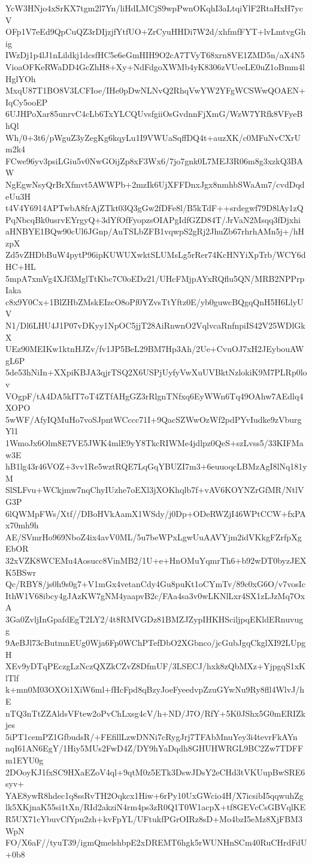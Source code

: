 YcW3HNjo4xSrKX7tgm2l7Yn/liHdLMCjS9wpPwnOKqhI3aLtqiYlF2RtaHxH7ycV
OFp1V7eEd9QpCuQZ3rDIjzjfYtfUO+ZrCyuHHDi7W2d/xhfmfFYT+lvLmtvgGhig
IWzDj1p4lJ1nLildkj1dcsfHC5e6eGmHIH9O2cA7TVyT68xrn8VE1ZMD5n/aX4N5
VioaOFKeRWaDD4GcZhH8+Xy+NdFdgoXWMb4yK8306zVUeeLE0uZ1oBmm4lHglYOh
MxqU87T1BO8V3LCFIoe/IHe0pDwNLNvQ2RhqVwYW2YFgWCSWwQOAEN+IqCy5ooEP
6UJHPoXar85unrvC4cLb6TxYLCQUvsfgiiOsGvdnnFjXmG/WzW7YRfk8VFyeBhQl
Wh/0+3t6/pWguZ3yZegKg6kqyLu1I9VWUaSqffDQ4t+auzXK/c0MFuNvCXrUm2k4
FCwe96yv3psiLGiu5v0NwGOijZp8xF3Wx6/7jo7gnk0L7MEJ3R06m8g3xzkQ3BAW
NgEgwNsyQrBrXfmvt5AWWPb+2mzIk6UjXFFDnxJgx8nmhbSWaAm7/cvdDqdeUu3H
t4V4Y6914APTwbA8frAjZTkt03Q3gGw2fDFe8l/B5kTdF++srdegwf79D8lAy1zQ
PqNbcqBk0usrvEYrgyQ+3dYfOfFyopzsOIAPgIdfGZD84T/JrVaN2Msqq3fDjxhi
aHNBYE1BQw90cUl6JGnp/AuTSLbZFB1vqwpS2gRj2JhuZb67rhrhAMn5j+/hHzpX
Zd5vZHDbBuW4pytP96ipKUWUXwktSLUMsLg5rRer74KcHNYiXpTrb/WCY6dHC+HL
5mpA7xmVg4XJf3MglTtKbc7C0oEDz21/UHcFMjpAYxRQflu5QN/MRB2NPPrpIaka
c8x9Y0Cx+1BlZHbZMskEIzcO8oPf0YZvsTtYftz0E/yb0guwcBQgqQnH5H6LlyUV
N1/Dl6LHU4J1P07vDKyy1NpOC5jjT28AiRnwnO2VqlvcaRnfnpiIS42V25WDlGkX
UEz90MEIKw1ktnHJZv/fv1JP5BeL29BM7Hp3Ah/2Ue+CvuOJ7xH2JEybouAWgL6P
5de53hNiIn+XXpiKBJA3qjrTSQ2X6USPjUyfyVwXuUVBktNzlokiK9M7PLRp0lov
VOgpF/tA4DA5kIT7oT4ZTfAHgGZ3rRlgnTNfxq6EyWWn6Tq49OAhw7AEdlq4XOPO
5wWF/AfyIQMuHo7voSJpntWCccc71I+9QacSZWwOzWf2pdPYvIudke9zVburgYl1
1WmoJx6Olm8E7VE5JWK4mlE9yY8TkcRIWMe4jdlpz0QeS+szLvss5/33KIFMaw3E
hB1lg43r46VOZ+3vv1Re5wztRQE7LqGqYBUZI7m3+6euuoqcLBMzAgI8lNq181yM
SlSLFvu+WCkjmw7nqChyIUzhe7oEXl3jXOKhqlb7f+vAV6KOYNZrGfMR/NtlVG3P
6lQWMpFWs/Xtf//DBoHVkAamX1WSdy/j0Dp+ODeRWZjI46WPtCCW+fxPAx70mh9h
AE/SVmrHo969NboZ4ix4avV0ML/5u7beWPxLgwUuAAVYjm2idVKkgFZrfpXgEbOR
32xVZK8WCEMu4Aosucc8VinMB2/1U+e+HnOMuYqmrTh6+b92wDT0byzJEXK5BSwr
Qc/RBY8/js0h9s0g7+V1mGx4vetanCdy4Gu8puKt1oCYmTv/89c0xG6O/v7vosIc
IthW1V68ibcy4gJAzKW7gNM4yaapvB2c/FAa4sa3v0wLKNlLxr4SX1zLJzMq7OxA
3Ga0ZvljInGpafdEgT2LY2/4t8RMVGDz81BMZJZypIHKHSciljpqEKldERnuvugg
9AeBJl73cButmnEUg0Wja6Fp0WChPTefDbO2XGbnco/jcGubJgqCkglXI92LUpgH
XEv9yDTqPEczgLzNczQXZkCZvZ8DfmUF/3LSECJ/hxk8zQbMXz+YjpgqS1xKlTlf
k+mn0M03OXOi1XiW6ml+fHcFpd8qBzyJoeFyeedvpZzuGYwNu9Ry8fll4WlvJ/hE
nTQ3nTtZZAldsVFtew2oPvChLxsg4cV/h+ND/J7O/RfY+5K0JShx5G0mERIZkjes
5iPT1cemPZ1GfbudsR/+FEfillLzwDNNi7cRygJrj7TFAbMnuYey3i4tevrFkAYn
nqI61AN6EgY/1Hiy5MUs2FwD4Z/DY9hYaDqdh8GHUHWRGL9BC2Zw7TDFFm1EYU0g
2DOoyKJ1fxSC9HXaEZoV4ql+9qtM0z5ETk3DswJDsY2eCHd3tVKUupBwSRE6syv+
YAE8ywR8hdec1q8ssRvTH2Oqkcx1Hiw+6rPy10UxGWcio4H/X7icsibI5qqwuhZg
lk5XKjnaK55si1tXn/RId2akziN4rm4ps3zR0Q1T0W1acpX+tf8GEVcCsGBVqlKE
R5UX71cYbuvCfYpu2zh+kvFpYL/UFtukfPGrOIRz8sD+Mo4bzI5eMz8XjFBM3WpN
FO/X6aF//tyuT39/igmQmelshbpE2xDREMT6hgk5rWUNHnSCm40RuCHrdFdU+0b8
